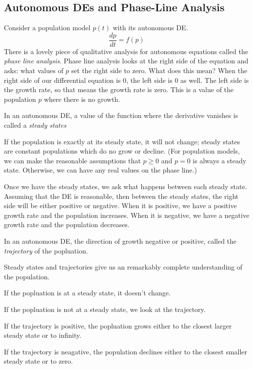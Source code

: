 \documentclass[fleqn,letterpaper]{report}
\begin{document}
\subsection{Autonomous DEs and Phase-Line Analysis}
\label{phase-line}

Consider a population model $p(t)$ with its autonomous DE.
\begin{equation*}
\frac{dp}{dt} = f(p)
\end{equation*}
There is a lovely piece of qualitative analysis for
autonomous equations called the \emph{phase line analysis}.
Phase line analysis looks at the right side of the equation
and asks: what values of $p$ set the right side to
zero. What does this mean? When the right side of our
differential equation is 0, the left side is 0 as well.
The left side is the growth rate, so that means the growth
rate is zero. This is a value of the population
$p$ where there is no growth. 

\begin{defn}
In an autonomous DE, a value of the
function where the derivative vanishes is called a 
\emph{steady states}
\end{defn}

If the population is
exactly at its steady state, it will not change; steady states
are constant populations which do no grow or decline. (For
population models, we can make the reasonable assumptions that
$p \geq 0$ and $p=0$ is always a steady state. Otherwise, we
can have any real values on the phase line.)

Once we have the steady states, we ask what happens between
each steady state. Assuming that the DE is reasonable, then
between the steady states, the right side will be either
positive or negative. When it is positive, we have a positive
growth rate and the population increases. When it is
negative, we have a negative growth rate and the population
decreases. 

\begin{defn}
In an autonomous DE, the direction of growth negative or
positive, called the \emph{trajectory} of the popluation.
\end{defn}

Steady states and trajectories give us an
remarkably complete understanding of the population.
\begin{smallitemize}
\item If the popluation is at a steady state, it doesn't
change.
\item If the popluation is not at a steady state, we look at
the trajectory.
\item If the trajectory is positive, the popluation grows
either to the closest larger steady state or to infinity.
\item If the trajectory is neagative, the population declines
either to the closest smaller steady state or to zero.
\end{smallitemize}
\end{document}
